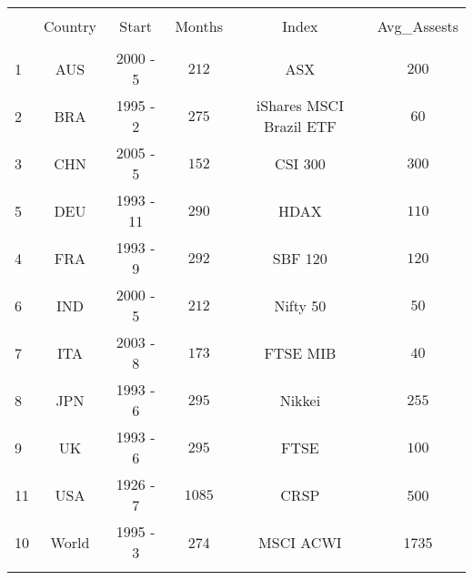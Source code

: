 \begin{tabular}{@{\extracolsep{5pt}} Hccccc} 
\\[-1.8ex]\hline 
\hline \\[-1.8ex] 
 & Country & Start & Months & Index & Avg\_Assests \\ 
\hline \\[-1.8ex] 
1 & AUS & 2000 - 5 & $212$& ASX & $200$ \\ 
2 & BRA & 1995 - 2 & $275$& iShares MSCI Brazil ETF& $60$ \\ 
3 & CHN & 2005 - 5 & $152$& CSI 300& $300$ \\ 
5 & DEU & 1993 - 11 & $290$& HDAX& $110$ \\
4 & FRA & 1993 - 9 & $292$& SBF 120& $120$ \\ 
6 & IND & 2000 - 5 & $212$& Nifty 50& $50$ \\ 
7 & ITA & 2003 - 8 & $173$& FTSE MIB& $40$ \\ 
8 & JPN & 1993 - 6 & $295$& Nikkei& $255$ \\ 
9 & UK & 1993 - 6 & $295$& FTSE& $100$ \\ 
11 & USA & 1926 - 7 & $1085$ & CRSP & 500\\
10 & World & 1995 - 3 & 274 & MSCI ACWI & 1735\\
\hline \\[-1.8ex] 
\end{tabular} 